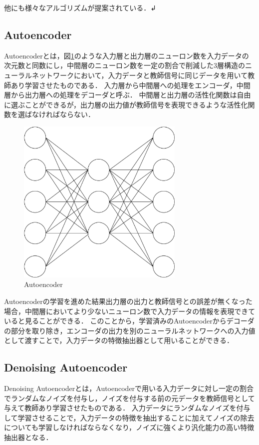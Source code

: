 他にも様々なアルゴリズムが提案されている．↲

\subsection{Autoencoder}
Autoencoderとは，図\ref{autoencoder}のような入力層と出力層のニューロン数を入力データの次元数と同数にし，中間層のニューロン数を一定の割合で削減した3層構造のニューラルネットワークにおいて，入力データと教師信号に同じデータを用いて教師あり学習させたものである．
入力層から中間層への処理をエンコーダ，中間層から出力層への処理をデコーダと呼ぶ．
中間層と出力層の活性化関数は自由に選ぶことができるが，出力層の出力値が教師信号を表現できるような活性化関数を選ばなければならない．

\begin{figure}[hbtp]
  \centering
  \includegraphics[bb=0 0 507 506, width=8cm]{Figures/autoencoder.pdf}
  \caption{Autoencoder}
  \label{autoencoder}
\end{figure}

Autoencoderの学習を進めた結果出力層の出力と教師信号との誤差が無くなった場合，中間層においてより少ないニューロン数で入力データの情報を表現できていると見ることができる．
このことから，学習済みのAutoencoderからデコーダの部分を取り除き，エンコーダの出力を別のニューラルネットワークへの入力値として渡すことで，入力データの特徴抽出器として用いることができる．

\subsection{Denoising Autoencoder}
Denoising Autoencoderとは，Autoencoderで用いる入力データに対し一定の割合でランダムなノイズを付与し，ノイズを付与する前の元データを教師信号として与えて教師あり学習させたものである．
入力データにランダムなノイズを付与して学習させることで，入力データの特徴を抽出することに加えてノイズの除去についても学習しなければならなくなり，ノイズに強くより汎化能力の高い特徴抽出器となる．

